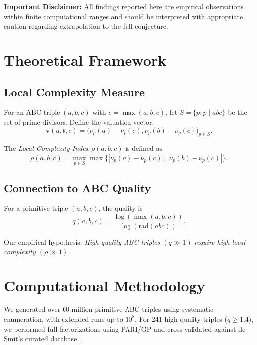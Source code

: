 \documentclass[11pt,a4paper]{article}
\begin{document}
\textbf{Important Disclaimer:} All findings reported here are empirical observations within finite computational ranges and should be interpreted with appropriate caution regarding extrapolation to the full conjecture.

\section{Theoretical Framework}

\subsection{Local Complexity Measure}

\begin{definition}
For an ABC triple $(a,b,c)$ with $c = \max(a,b,c)$, let $S=\{p : p \mid abc\}$ be the set of prime divisors. Define the valuation vector:
\[
\mathbf{v}(a,b,c) = \big(\nu_p(a) - \nu_p(c), \nu_p(b) - \nu_p(c)\big)_{p \in S}.
\]
\end{definition}

\begin{definition}
The \emph{Local Complexity Index} $\rho(a,b,c)$ is defined as
\[
\rho(a,b,c) = \max_{p \in S} \max \{ |\nu_p(a)-\nu_p(c)|, |\nu_p(b)-\nu_p(c)|\}.
\]
\end{definition}

\subsection{Connection to ABC Quality}

\begin{definition}
For a primitive triple $(a,b,c)$, the quality is
\[
q(a,b,c) = \frac{\log(\max(a,b,c))}{\log(\text{rad}(abc))}.
\]
\end{definition}

Our empirical hypothesis: \emph{High-quality ABC triples $(q \gg 1)$ require high local complexity $(\rho \gg 1)$.}

\section{Computational Methodology}

We generated over $60$ million primitive ABC triples using systematic enumeration, with extended runs up to $10^8$. For 241 high-quality triples ($q \geq 1.4$), we performed full factorizations using PARI/GP and cross-validated against de Smit’s curated database \citep{desmit2024abcdb}.
\end{document}
